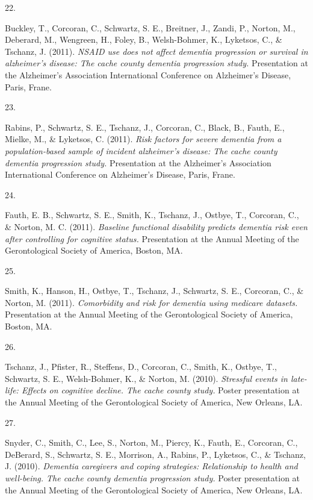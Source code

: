 \documentclass[11pt,a4paper,]{moderncv}
\newlength{\csllabelwidth}
\newcommand{\CSLLeftMargin}[1]{\parbox[t]{\csllabelwidth}{#1}}
\newcommand{\CSLRightInline}[1]{\parbox[t]{\linewidth - \csllabelwidth}{#1}}
\begin{document}
\leavevmode{}%
\CSLLeftMargin{22. }
\CSLRightInline{Buckley, T., Corcoran, C., Schwartz, S. E., Breitner,
J., Zandi, P., Norton, M., Deberard, M., Wengreen, H., Foley, B.,
Welsh-Bohmer, K., Lyketsos, C., \& Tschanz, J. (2011). \emph{NSAID use
does not affect dementia progression or survival in alzheimer's disease:
The cache county dementia progression study.} Presentation at the
Alzheimer's Association International Conference on Alzheimer's Disease,
Paris, Frane.}

\leavevmode{}%
\CSLLeftMargin{23. }
\CSLRightInline{Rabins, P., Schwartz, S. E., Tschanz, J., Corcoran, C.,
Black, B., Fauth, E., Mielke, M., \& Lyketsos, C. (2011). \emph{Risk
factors for severe dementia from a population-based sample of incident
alzheimer's disease: The cache county dementia progression study.}
Presentation at the Alzheimer's Association International Conference on
Alzheimer's Disease, Paris, Frane.}

\leavevmode{}%
\CSLLeftMargin{24. }
\CSLRightInline{Fauth, E. B., Schwartz, S. E., Smith, K., Tschanz, J.,
Ostbye, T., Corcoran, C., \& Norton, M. C. (2011). \emph{Baseline
functional disability predicts dementia risk even after controlling for
cognitive status.} Presentation at the Annual Meeting of the
Gerontological Society of America, Boston, MA.}

\leavevmode{}%
\CSLLeftMargin{25. }
\CSLRightInline{Smith, K., Hanson, H., Ostbye, T., Tschanz, J.,
Schwartz, S. E., Corcoran, C., \& Norton, M. (2011). \emph{Comorbidity
and risk for dementia using medicare datasets.} Presentation at the
Annual Meeting of the Gerontological Society of America, Boston, MA.}

\leavevmode{}%
\CSLLeftMargin{26. }
\CSLRightInline{Tschanz, J., Pfister, R., Steffens, D., Corcoran, C.,
Smith, K., Ostbye, T., Schwartz, S. E., Welsh-Bohmer, K., \& Norton, M.
(2010). \emph{Stressful events in late-life: Effects on cognitive
decline. The cache county study.} Poster presentation at the Annual
Meeting of the Gerontological Society of America, New Orleans, LA.}

\leavevmode{}%
\CSLLeftMargin{27. }
\CSLRightInline{Snyder, C., Smith, C., Lee, S., Norton, M., Piercy, K.,
Fauth, E., Corcoran, C., DeBerard, S., Schwartz, S. E., Morrison, A.,
Rabins, P., Lyketsos, C., \& Tschanz, J. (2010). \emph{Dementia
caregivers and coping strategies: Relationship to health and well-being.
The cache county dementia progression study.} Poster presentation at the
Annual Meeting of the Gerontological Society of America, New Orleans,
LA.}
\end{document}

